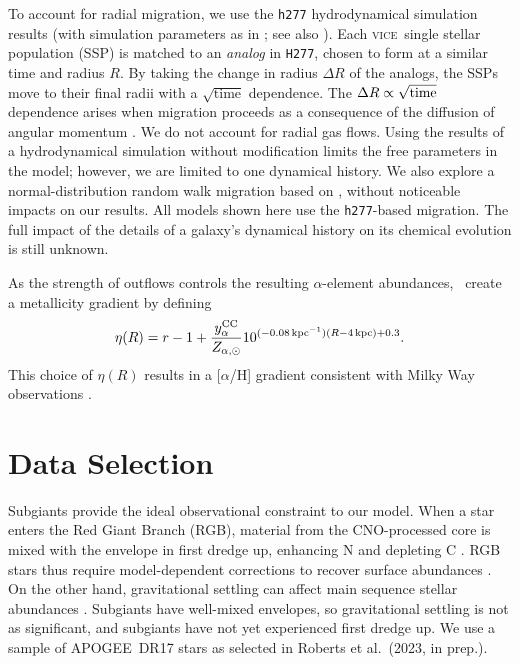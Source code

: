 \documentclass[fleqn,
usenatbib]{mnras}
\newcommand{\JJ}{\citetalias{james+21}}
\newcommand{\VICE}{\textsc{vice}}
\newcommand{\citetjack}{Roberts et al.~(2023, in prep.)}
\newcommand{\apogee}{APOGEE}
\begin{document}
To account for radial migration, we use the \texttt{h277} hydrodynamical
simulation results (with simulation parameters as in \citealt{bird+21}; see also \citealt{christensen12, zolotov12, loebman12, BZ14}).  
Each \VICE\ single stellar population (SSP) is matched to an \textit{analog} in \texttt{H277}, chosen to form at a similar time and radius $R$. By taking the change in radius $\Delta R$ of the analogs, the SSPs move to their final radii with a $\sqrt{\text{time}}$ dependence.
The $\Delta R \propto \sqrt{\rm time}$ dependence arises when migration proceeds as a consequence of the diffusion of angular momentum \citep{frankel18, frankel20}.
We do not account for radial gas flows.
Using the results of a hydrodynamical simulation without modification limits the free parameters in the model; however, we are limited to one dynamical history. 
We also explore a normal-distribution random walk migration based on \citet{frankel18}, without noticeable impacts on our results. All models shown here use the \texttt{h277}-based migration. The full impact of the details of a galaxy's dynamical history on its chemical evolution is still unknown.

As the strength of outflows controls the resulting $\alpha$-element abundances, \JJ~create a metallicity gradient by defining
\begin{equation}\label{eq:eta_r}
\eta(R) = r - 1 + \frac{y_{\alpha}^{\rm CC}}{Z_{\alpha, \odot}} 10^{(-0.08\,\text{kpc}^{-1})(R-4\,\text{kpc})+0.3}.
\end{equation}
This choice of $\eta(R)$ results in a [$\alpha$/H] gradient consistent with Milky Way observations \citep[e.g.][]{hayden+14, weinberg+19, frinchaboy+13}.


\section{Data Selection}


Subgiants provide the ideal observational constraint to our model. 
When a star enters the Red Giant Branch (RGB), material from the CNO-processed core is mixed with the envelope in first dredge up, enhancing N and depleting C \citep{iben67, vincenzo+21,KL14}. RGB stars thus require model-dependent corrections to recover surface abundances \citep[e.g.][]{vincenzo+21}. On the other hand, gravitational settling can affect main sequence stellar abundances \citep[e.g.][]{souto19}. Subgiants have well-mixed envelopes, so gravitational settling is not as significant, and subgiants have not yet experienced first dredge up. We use a sample of \apogee\ DR17 stars \citep{apogee17} as selected in \citetjack.  
\end{document}
